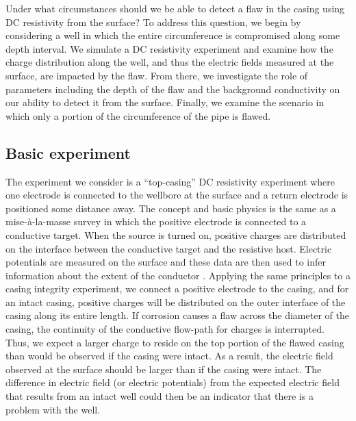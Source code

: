 \documentclass[extra,mreferee]{gji}
\begin{document}
Under what circumstances should we be able to detect a flaw in the casing using DC resistivity from the surface? To address this question, we begin by considering a well in which the entire circumference is compromised along some depth interval. We simulate a DC resistivity experiment and examine how the charge distribution along the well, and thus the electric fields measured at the surface, are impacted by the flaw. From there, we investigate the role of parameters including the depth of the flaw and the background conductivity on our ability to detect it from the surface. Finally, we examine the scenario in which only a portion of the circumference of the pipe is flawed.

\subsection{Basic experiment}

The experiment we consider is a ``top-casing'' DC resistivity experiment where one electrode is connected to the wellbore at the surface and a return electrode is positioned some distance away. The concept and basic physics is the same as a mise-\`a-la-masse survey in which the positive electrode is connected to a conductive target. When the source is turned on, positive charges are distributed on the interface between the conductive target and the resistive host. Electric potentials are measured on the surface and these data are then used to infer information about the extent of the conductor \citep{Telford1990}. Applying the same principles to a casing integrity experiment, we connect a positive electrode to the casing, and for an intact casing, positive charges will be distributed on the outer interface of the casing along its entire length. If corrosion causes a flaw across the diameter of the casing, the continuity of the conductive flow-path for charges is interrupted. Thus, we expect a larger charge to reside on the top portion of the flawed casing than would be observed if the casing were intact. As a result, the electric field observed at the surface should be larger than if the casing were intact. The difference in electric field (or electric potentials) from the expected electric field that results from an intact well could then be an indicator that there is a problem with the well.
\end{document}
